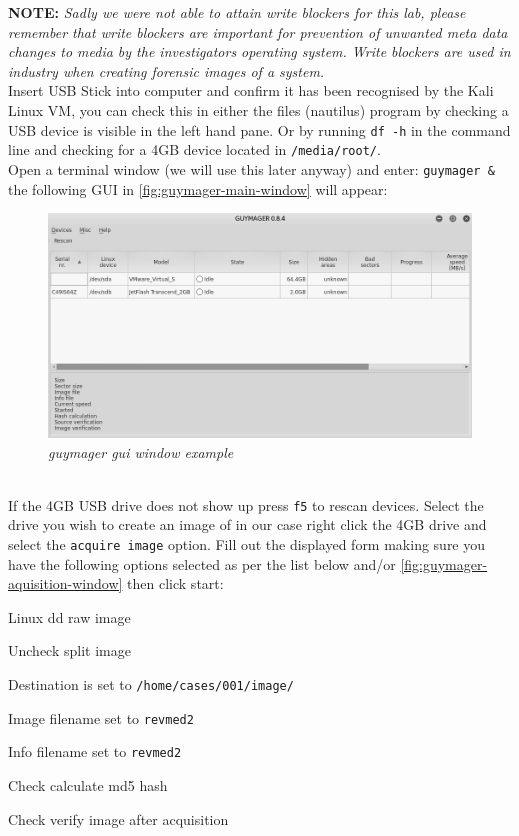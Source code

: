\documentclass[a4paper,11pt]{article}
\begin{document}
\textbf{NOTE:} \textit{Sadly we were not able to attain write blockers for this lab, please remember that write blockers are important for prevention of unwanted meta data changes to media by the investigators operating system. Write blockers are used in industry when creating forensic images of a system.}\\

Insert USB Stick into computer and confirm it has been recognised by the Kali Linux VM, you can check this in either the files (nautilus) program by checking a USB device is visible in the left hand pane. Or by running \texttt{df -h} in the command line and checking for a 4GB device located in \texttt{/media/root/}. \\

Open a terminal window (we will use this later anyway) and enter: \texttt{{guymager {\&}}} the following GUI in \autoref{fig:guymager-main-window} will appear:
\begin{figure}[h]
	\centering
	\includegraphics[scale=0.5]{guymager-window}
	\caption{\textit{guymager gui window example}}
	\label{fig:guymager-main-window}
\end{figure}
\\
If the 4GB USB drive does not show up press \texttt{f5} to rescan devices.  Select the drive you wish to create an image of in our case right click the 4GB drive and select the \texttt{acquire image} option. Fill out the displayed form making sure you have the following options selected as per the list below and/or \autoref{fig:guymager-aquisition-window} then click start:
\begin{itemize*}
\item Linux dd raw image
\item Uncheck split image
\item Destination is set to \texttt{/home/cases/001/image/}
\item Image filename set to \texttt{revmed2}
\item Info filename set to \texttt{revmed2}
\item Check calculate md5 hash
\item Check verify image after acquisition
\end{itemize*}
\end{document}
